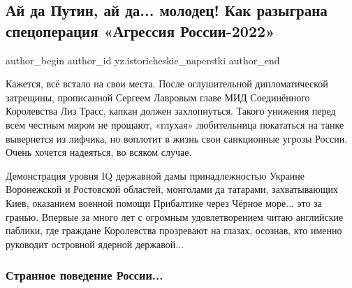  
 
 
 
 
 
\subsection{Ай да Путин, ай да... молодец! Как разыграна спецоперация «Агрессия России-2022»}
\label{sec:13_02_2022.yz.istoricheskie_naperstki.1.ajda_putin_molodec}
 
\ifcmt
 author_begin
   author_id yz.istoricheskie_naperstki
 author_end
\fi

Кажется, всё встало на свои места. После оглушительной дипломатической
затрещины, прописанной Сергеем Лавровым главе МИД Соединённого Королевства Лиз
Трасс, капкан должен захлопнуться. Такого унижения перед всем честным миром не
прощают, «глухая» любительница покататься на танке вывернется из лифчика, но
воплотит в жизнь свои санкционные угрозы России. Очень хочется надеяться, во
всяком случае.


Демонстрация уровня IQ державной дамы принадлежностью Украине Воронежской и
Ростовской областей, монголами да татарами, захватывающих Киев, оказанием
военной помощи Прибалтике через Чёрное море... это за гранью. Впервые за много
лет с огромным удовлетворением читаю английские паблики, где граждане
Королевства прозревают на глазах, осознав, кто именно руководит островной
ядерной державой...

\subsubsection{Странное поведение России...}

